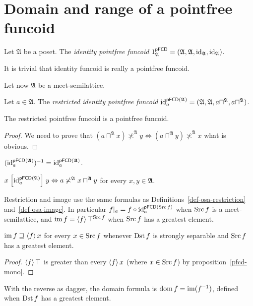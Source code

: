 \section{Domain and range of a pointfree funcoid}
\begin{defn}
Let $\mathfrak{A}$ be a poset.
The \emph{identity pointfree funcoid} $1_{\mathfrak{A}}^{\mathsf{pFCD}}=(\mathfrak{A},\mathfrak{A},{\operatorname{id}}_{\mathfrak{A}},{\operatorname{id}}_{\mathfrak{A}})$.
\end{defn}
It is trivial that identity funcoid is really a pointfree funcoid.

Let now $\mathfrak{A}$ be a meet-semilattice.
\begin{defn}
Let $a\in\mathfrak{A}$.
The \emph{restricted identity pointfree funcoid} ${\operatorname{id}}_{a}^{\mathsf{pFCD}(\mathfrak{A})}=(\mathfrak{A},\mathfrak{A},a\sqcap^{\mathfrak{A}},a\sqcap^{\mathfrak{A}})$.\end{defn}
\begin{prop}
The restricted pointfree funcoid is a pointfree funcoid.\end{prop}
\begin{proof}
We need to prove that $(a\sqcap^{\mathfrak{A}}x)\nasymp^{\mathfrak{A}}y\Leftrightarrow(a\sqcap^{\mathfrak{A}}y)\nasymp^{\mathfrak{A}}x$
what is obvious.\end{proof}
\begin{obvious}
$({\operatorname{id}}_{a}^{\mathsf{pFCD}(\mathfrak{A})})^{-1}={\operatorname{id}}_{a}^{\mathsf{pFCD}(\mathfrak{A})}$.
\end{obvious}

\begin{obvious}
$x\mathrel{\left[{\operatorname{id}}_{a}^{\mathsf{pFCD}(\mathfrak{A})}\right]}y\Leftrightarrow a\not\asymp^{\mathfrak{A}}x\sqcap^{\mathfrak{A}}y$
for every $x,y\in\mathfrak{A}$.\end{obvious}
Restriction and image use the same formulas as
Definitions~\ref{def-osa-restriction} and~\ref{def-osa-image}.
In particular $f|_a=f\circ{\operatorname{id}}_a^{\mathsf{pFCD}(\operatorname{Src} f)}$
when $\operatorname{Src} f$ is a meet-semilattice, and $\operatorname{im} f=\left\langle f\right\rangle\top^{\operatorname{Src} f}$
when $\operatorname{Src} f$ has a greatest element.

\begin{prop}\label{pf-im-sub}
$\operatorname{im} f\sqsupseteq\left\langle f\right\rangle x$ for every $x\in\operatorname{Src} f$ whenever $\operatorname{Dst} f$
is strongly separable and $\operatorname{Src} f$ has a greatest element.\end{prop}
\begin{proof}
$\left\langle f\right\rangle\top$ is greater than every $\left\langle f\right\rangle x$ (where $x\in\operatorname{Src} f$)
by proposition~\ref{pfcd-mono}.\end{proof}
With the reverse as dagger, the domain formula is $\operatorname{dom} f=\operatorname{im}(f^{-1})$,
defined when $\operatorname{Dst} f$ has a greatest element.

